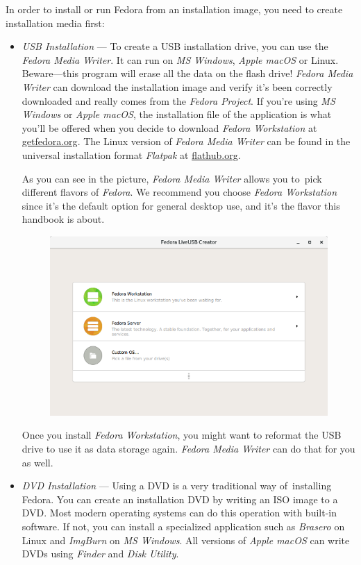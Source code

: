 In order to install or run Fedora from an installation image, you need to create installation media first:
\begin{itemize}
\item\emph{USB Installation} --- To create a USB installation drive, you can use the \emph{Fedora Media Writer}. It can run on \emph{MS Windows}, \emph{Apple macOS} or Linux. Beware---this program will erase all the data on the flash drive! \emph{Fedora Media Writer} can download the installation image and verify it's been correctly downloaded and really comes from the \emph{Fedora Project}. If you're using \emph{MS Windows} or \emph{Apple macOS}, the installation file of the application is what you'll be offered when you decide to download \emph{Fedora Workstation} at \url{getfedora.org}. The Linux version of \emph{Fedora Media Writer} can be found in the universal installation format \emph{Flatpak} at \url{flathub.org}.

As you can see in the picture, \emph{Fedora Media Writer} allows you to~pick different flavors of \emph{Fedora}. We recommend you choose \emph{Fedora Workstation} since it's the default option for general desktop use, and it's the flavor this handbook is about.

\begin{figure}[tbp]
\begin{center}
\includegraphics[width=.74\textwidth]{img/fedora-media-writer}
 \label{fig:fedora_media_writer}
\end{center}
\end{figure}

Once you install \emph{Fedora Workstation}, you might want to reformat the USB drive to use it as data storage again. \emph{Fedora Media Writer} can do that for you as well.

\item\emph{DVD Installation} --- Using a DVD is a very traditional way of~installing Fedora. You can create an installation DVD by writing an ISO image to a DVD. Most modern operating systems can do this operation with built-in software. If not, you can install a specialized application such as \emph{Brasero} on Linux and \emph{ImgBurn} on \emph{MS Windows}. All versions of \emph{Apple macOS} can write DVDs using \emph{Finder} and \emph{Disk Utility}.
\end{itemize}

